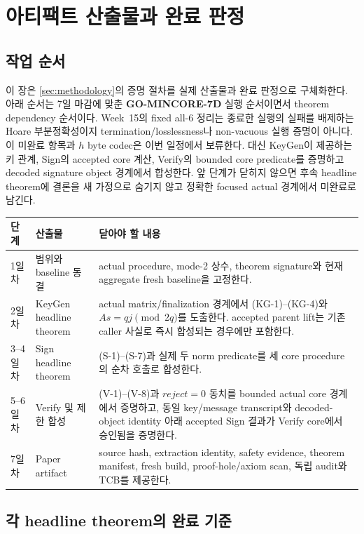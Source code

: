 \section{아티팩트 산출물과 완료 판정}
\label{sec:artifact-plan}

\subsection{작업 순서}

이 장은 \cref{sec:methodology}의 증명 절차를 실제 산출물과 완료 판정으로
구체화한다.
아래 순서는 7일 마감에 맞춘 \textbf{GO-MINCORE-7D} 실행 순서이면서 theorem
dependency 순서이다. Week~15의 fixed all-6 정리는 종료한 실행의 실패를
배제하는 Hoare 부분정확성이지 termination/losslessness나 non-vacuous 실행
증명이 아니다. 이 미완료 항목과 \(h\) byte codec은 이번 일정에서 보류한다.
대신 KeyGen이 제공하는 키 관계, Sign의 accepted core 계산, Verify의 bounded
core predicate를 증명하고 decoded signature object 경계에서 합성한다. 앞 단계가
닫히지 않으면 후속 headline theorem에 결론을 새 가정으로 숨기지 않고 정확한
focused actual 경계에서 미완료로 남긴다.

\begin{longtable}{L{13mm}L{37mm}L{92mm}}
\toprule
단계 & 산출물 & 닫아야 할 내용 \\
\midrule
\endhead
1일차 & 범위와 baseline 동결 &
actual procedure, mode-2 상수, theorem signature와 현재 aggregate fresh
baseline을 고정한다. \\
2일차 & KeyGen headline theorem &
actual matrix/finalization 경계에서 \textup{(KG-1)}--\textup{(KG-4)}와
\(As=qj\pmod{2q}\)를 도출한다. accepted parent lift는 기존 caller 사실로
즉시 합성되는 경우에만 포함한다. \\
3--4일차 & Sign headline theorem &
\textup{(S-1)}--\textup{(S-7)}과 실제 두 norm predicate를 세 core
procedure의 순차 호출로 합성한다. \\
5--6일차 & Verify 및 제한 합성 &
\textup{(V-1)}--\textup{(V-8)}과 \(reject=0\) 동치를 bounded actual core
경계에서 증명하고, 동일 key/message transcript와 decoded-object identity 아래
accepted Sign 결과가 Verify core에서 승인됨을 증명한다. \\
7일차 & Paper artifact &
source hash, extraction identity, safety evidence, theorem manifest, fresh
 build, proof-hole/axiom scan, 독립 audit와 TCB를 제공한다. \\
\bottomrule
\end{longtable}

\subsection{각 headline theorem의 완료 기준}

